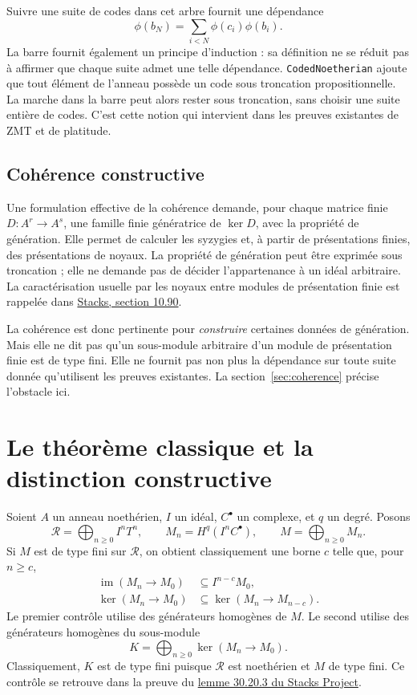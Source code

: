 \documentclass[11pt]{amsart}
\begin{document}
Suivre une suite de codes dans cet arbre fournit une dépendance
\[
 \phi(b_N)=\sum_{i<N}\phi(c_i)\phi(b_i).
\]
La barre fournit également un principe d'induction : sa définition ne
se réduit pas à affirmer que chaque suite admet une telle dépendance.
\texttt{CodedNoetherian} ajoute que tout élément de l'anneau possède
un code sous troncation propositionnelle. La marche dans la barre
peut alors rester sous troncation, sans choisir une suite entière de codes.
C'est cette notion qui intervient dans les preuves existantes de
ZMT et de platitude.

\subsection*{Cohérence constructive}
Une formulation effective de la cohérence demande, pour chaque matrice
finie $D:A^r\to A^s$, une famille finie génératrice de $\ker D$, avec
la propriété de génération. Elle permet de calculer les syzygies et,
à partir de présentations finies, des présentations de noyaux.
La propriété de génération peut être exprimée sous troncation ;
elle ne demande pas de décider l'appartenance à un idéal arbitraire.
La caractérisation usuelle par les noyaux entre modules de présentation
finie est rappelée dans
\href{https://stacks.math.columbia.edu/tag/05CU}{Stacks, section 10.90}.

La cohérence est donc pertinente pour \emph{construire} certaines données
de génération. Mais elle ne dit pas qu'un sous-module arbitraire d'un
module de présentation finie est de type fini. Elle ne fournit pas
non plus la dépendance sur toute suite donnée qu'utilisent les preuves
existantes. La section~\ref{sec:coherence} précise l'obstacle ici.

\section{Le théorème classique et la distinction constructive}

Soient $A$ un anneau noethérien, $I$ un idéal, $C^\bullet$ un complexe,
et $q$ un degré. Posons
\[
 \mathcal R=\bigoplus_{n\geq0}I^nT^n,
 \qquad M_n=H^q(I^nC^\bullet),\qquad
 M=\bigoplus_{n\geq0}M_n.
\]
Si $M$ est de type fini sur $\mathcal R$, on obtient classiquement une
borne $c$ telle que, pour $n\geq c$,
\begin{align*}
 \operatorname{im}(M_n\longrightarrow M_0)&\subseteq I^{n-c}M_0,\\
 \ker(M_n\longrightarrow M_0)&\subseteq
 \ker(M_n\longrightarrow M_{n-c}).
\end{align*}
Le premier contrôle utilise des générateurs homogènes de $M$.
Le second utilise des générateurs homogènes du sous-module
\[
 K=\bigoplus_{n\geq0}\ker(M_n\longrightarrow M_0).
\]
Classiquement, $K$ est de type fini puisque $\mathcal R$ est noethérien
et $M$ de type fini. Ce contrôle se retrouve dans la preuve du
\href{https://stacks.math.columbia.edu/tag/02O7}{lemme 30.20.3 du Stacks Project}.
\end{document}
